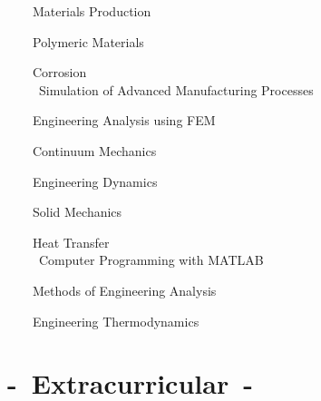 \documentclass[11pt,letterpaper,sans]{moderncv}        %
\begin{document}
\ \ \ \ {Materials Production}

\ \ \ \ {Polymeric Materials}

\ \ \ \ {Corrosion}\\

\ \ \ \ \ {Simulation of Advanced Manufacturing Processes}

\ \ \ \ {Engineering Analysis using FEM}

\ \ \ \ {Continuum Mechanics}

\ \ \ \ {Engineering Dynamics}

\ \ \ \ {Solid Mechanics}

\ \ \ \ {Heat Transfer}\\

\ \ \ \ \ {Computer Programming with MATLAB}

\ \ \ \ {Methods of Engineering Analysis}

\ \ \ \ {Engineering Thermodynamics}\\


\section{-\ Extracurricular\ -}






\end{document}

